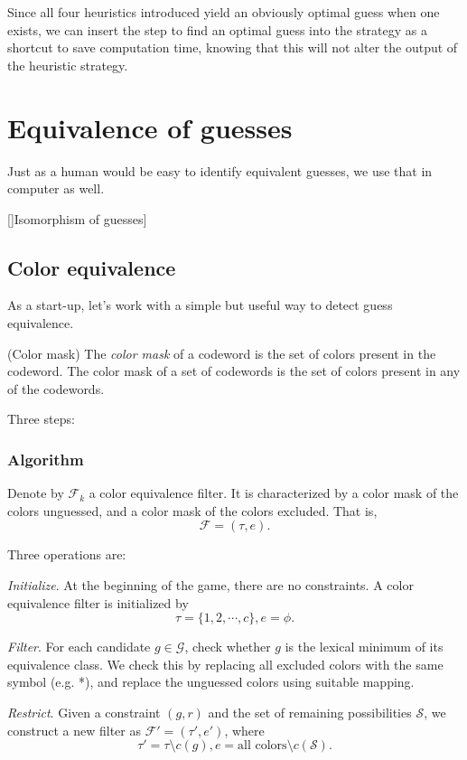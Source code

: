 Since all four heuristics introduced yield an obviously optimal guess when one exists, we can insert the step to find an optimal guess into the strategy as a shortcut to save computation time, knowing that this will not alter the output of the heuristic strategy.

\section{Equivalence of guesses}

Just as a human would be easy to identify equivalent guesses, we use that in computer as well.

[]Isomorphism of guesses]

\subsection{Color equivalence}

As a start-up, let's work with a simple but useful way to detect guess equivalence.

\begin{definition}
(Color mask) The \emph{color mask} of a codeword is the set of colors present in the codeword. The color mask of a set of codewords is the set of colors present in any of the codewords.
\end{definition}

Three steps:

\subsubsection{Algorithm}

Denote by $\mathcal{F}_k$ a color equivalence filter. It is characterized by a color mask of the colors unguessed, and a color mask of the colors excluded. That is,
\[
\mathcal{F} = (\tau, e) .
\]



Three operations are:

\emph{Initialize}. At the beginning of the game, there are no constraints. A color equivalence filter is initialized by
\[
\tau = \{ 1, 2, \cdots, c \}, e = \phi .
\]

\emph{Filter}. For each candidate $g \in \mathcal{G}$, check whether $g$ is the lexical minimum of its equivalence class. We check this by replacing all excluded colors with the same symbol (e.g. *), and replace the unguessed colors using suitable mapping.

\emph{Restrict}. Given a constraint $(g,r)$ and the set of remaining possibilities $\mathcal{S}$, we construct a new filter as $\mathcal{F}' = (\tau', e')$, where
\[
\tau' = \tau \setminus c(g), e = \text{all colors} \setminus c(\mathcal{S})  .
\]



